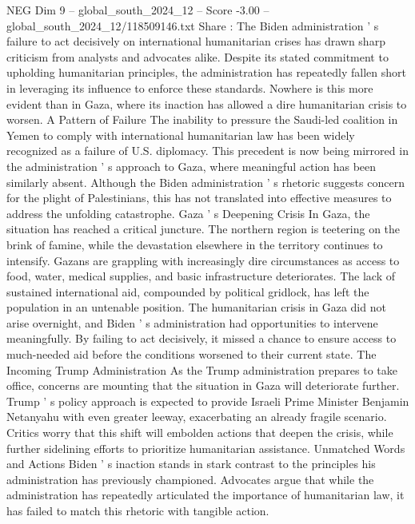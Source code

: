 \begin{textsample}{NEG Dim 9 – global\_south\_2024\_12 – Score -3.00 – global\_south\_2024\_12/118509146.txt}  \label{ex:f9_neg_133}
Share : The Biden administration ' s failure to act decisively on international humanitarian crises has drawn sharp criticism from analysts and advocates alike.
Despite its stated commitment to upholding humanitarian principles, the administration has repeatedly fallen short in leveraging its influence to enforce these standards.
Nowhere is this more evident than in Gaza, where its inaction has allowed a dire humanitarian crisis to worsen.
A Pattern of Failure The inability to pressure the Saudi-led coalition in Yemen to comply with international humanitarian law has been widely recognized as a failure of U.S. diplomacy.
This precedent is now being mirrored in the administration ' s approach to Gaza, where meaningful action has been similarly absent.
Although the Biden administration ' s rhetoric suggests concern for the plight of Palestinians, this has not translated into effective measures to address the unfolding catastrophe.
Gaza ' s Deepening Crisis In Gaza, the situation has reached a critical juncture.
The northern region is teetering on the brink of famine, while the devastation elsewhere in the territory continues to intensify.
Gazans are grappling with increasingly dire circumstances as access to food, water, medical supplies, and basic infrastructure deteriorates.
The lack of sustained international aid, compounded by political gridlock, has left the population in an untenable position.
The humanitarian crisis in Gaza did not arise overnight, and Biden ' s administration had opportunities to intervene meaningfully.
By failing to act decisively, it missed a chance to ensure access to much-needed aid before the conditions worsened to their current state.
The Incoming Trump Administration As the Trump administration prepares to take office, concerns are mounting that the situation in Gaza will deteriorate further.
Trump ' s policy approach is expected to provide Israeli Prime Minister Benjamin Netanyahu with even greater leeway, exacerbating an already fragile scenario.
Critics worry that this shift will embolden actions that deepen the crisis, while further sidelining efforts to prioritize humanitarian assistance.
Unmatched Words and Actions Biden ' s inaction stands in stark contrast to the principles his administration has previously championed.
Advocates argue that while the administration has repeatedly articulated the importance of humanitarian law, it has failed to match this rhetoric with tangible action.

\end{textsample}
